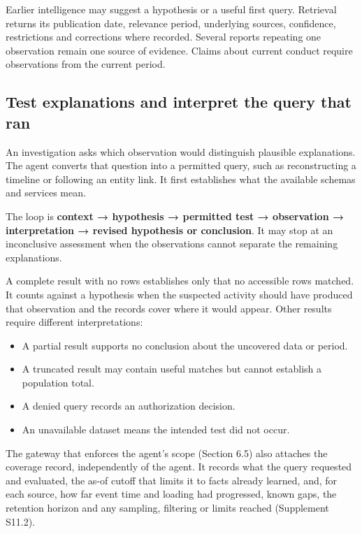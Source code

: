 \documentclass[acmlarge,review,anonymous,nonacm]{acmart}
\providecommand{\tightlist}{\setlength{\itemsep}{0pt}\setlength{\parskip}{0pt}}
\begin{document}
Earlier intelligence may suggest a hypothesis or a useful first query.
Retrieval returns its publication date, relevance period, underlying
sources, confidence, restrictions and corrections where recorded.
Several reports repeating one observation remain one source of evidence.
Claims about current conduct require observations from the current
period.

\hypertarget{test-explanations-and-interpret-the-query-that-ran}{%
\subsection{Test explanations and interpret the query that
ran}\label{test-explanations-and-interpret-the-query-that-ran}}

An investigation asks which observation would distinguish plausible
explanations. The agent converts that question into a permitted query,
such as reconstructing a timeline or following an entity link. It first
establishes what the available schemas and services mean.

The loop is \textbf{context → hypothesis → permitted test → observation
→ interpretation → revised hypothesis or conclusion}. It may stop at an
inconclusive assessment when the observations cannot separate the
remaining explanations.

A complete result with no rows establishes only that no accessible rows
matched. It counts against a hypothesis when the suspected activity
should have produced that observation and the records cover where it
would appear. Other results require different interpretations:

\begin{itemize}
\tightlist
\item
  A partial result supports no conclusion about the uncovered data or
  period.
\item
  A truncated result may contain useful matches but cannot establish a
  population total.
\item
  A denied query records an authorization decision.
\item
  An unavailable dataset means the intended test did not occur.
\end{itemize}

The gateway that enforces the agent's scope (Section 6.5) also attaches
the coverage record, independently of the agent. It records what the
query requested and evaluated, the as-of cutoff that limits it to facts
already learned, and, for each source, how far event time and loading
had progressed, known gaps, the retention horizon and any sampling,
filtering or limits reached (Supplement S11.2).
\end{document}
